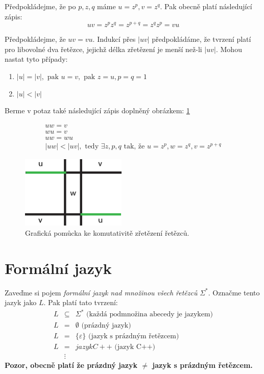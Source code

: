 \documentclass[10pt, a4paper, titlepage]{article}
\theoremstyle{note}
\begin{document}
\begin{itemize}
Předpokládejme, že po $p, z, q$ máme $u = z^{p}, v = z^{q}$. Pak obecně platí následující zápis:
$$
uv = z^{p}z^{q} = z^{p+q} = z^{q} z^{p} = vu
$$

Předpokládejme, že $uv = vu$. Indukcí přes $|uv|$ předpokládáme, že tvrzení platí pro libovolné dva řetězce, jejichž délka zřetězení je menší
než-li $|uv|$. Mohou nastat tyto případy:
\begin{enumerate}
\item
$|u| = |v|, \text{ pak } u = v, \text{ pak } z = u, p = q = 1$

\item
$|u| < |v|$
\end{enumerate}

Berme v potaz také následující zápis doplněný obrázkem: \ref{obr-1}

\begin{gather*}
uw = v \\
wu = v \\
uw = wu \\
|uw| < |uv|, \text{ tedy } \exists z, p, q  \text{ tak, že } u = z^{p}, w = z^{q}, v = z^{p+q}
\end{gather*}

\begin{figure}[ht]
\centering\includegraphics[width=5cm]{dukaz-1.eps}
\caption{Grafická pomůcka ke komutativitě zřetězení řetězců.}\label{obr-1}
\end{figure}
\end{itemize}

\section{Formální jazyk}
Zaveďme si pojem \emph{formální jazyk nad množinou všech řetězců} $\Sigma^{*}$. Označme tento jazyk jako $L$. Pak platí tato tvrzení:
\begin{eqnarray*}
L &\subseteq& \Sigma^{*} \text{ (každá podmnožina abecedy je jazykem)} \\
L &=& \emptyset \text{ (prázdný jazyk)} \\
L &=& \lbrace \varepsilon \rbrace \text{ (jazyk s prázdným řetězcem)} \\
L &=& jazyk C++ \text{ (jazyk C++)} \\
&\vdots&
\end{eqnarray*}
\textbf{Pozor, obecně platí že prázdný jazyk $\neq$ jazyk s prázdným řetězcem.}
	
\end{document}
